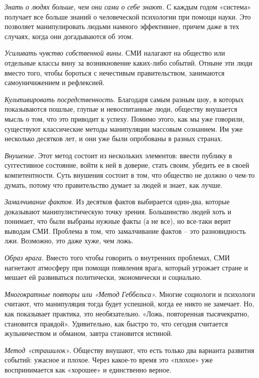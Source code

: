\textit{Знать о людях больше, чем они сами о себе знают.} С каждым годом «система» получает все больше знаний о человеческой психологии при помощи науки. Это позволяет манипулировать людьми намного эффективнее, причем даже в тех случаях, когда они догадываются об этом.

\textit{Усиливать чувство собственной вины.} СМИ налагают на общество или отдельные классы вину за возникновение каких-либо событий. Отныне эти люди вместо того, чтобы бороться с нечестивым правительством, занимаются самоуничижением и рефлексией.

\textit{Культивировать посредственность.} Благодаря самым разным шоу, в которых показываются пошлые, глупые и невоспитанные люди, обществу внушается мысль о том, что это приводит к успеху. Помимо этого, как мы уже говорили, существуют классические методы манипуляции массовым сознанием. Им уже несколько десятков лет, и они уже были опробованы в разных странах.

\textit{Внушение.} Этот метод состоит из нескольких элементов: ввести публику в суггестивное состояние, войти к ней в доверие, стать своим, убедить ее в своей компетентности. Суть внушения состоит в том, что общество не должно о чем-то думать, потому что правительство думает за людей и знает, как лучше.

\textit{Замалчивание фактов.} Из десятков фактов выбирается один-два, которые доказывают манипулистическую точку зрения. Большинство людей хоть и понимает, что были выбраны нужные факты (а не все), но все-таки верит выводам СМИ. Проблема в том, что замалчивание фактов – это разновидность лжи. Возможно, это даже хуже, чем ложь.

\textit{Образ врага.} Вместо того чтобы говорить о внутренних проблемах, СМИ нагнетают атмосферу при помощи появления врага, который угрожает стране и мешает ей развиваться политически, экономически и социально.

\textit{Многократные повторы или «Метод Геббельса».} Многие социологи и психологи считают, что манипуляция тогда будет успешной, когда ее никто не замечает. Но, как показывает практика, это необязательно. «Ложь, повторенная тысячекратно, становится правдой». Удивительно, как быстро то, что сегодня считается жульничеством и обманом, завтра становится истиной.

\textit{Метод «страшилок».} Обществу внушают, что есть только два варианта развития событий: ужасное и плохое. Через какое-то время это «плохое» уже воспринимается как «хорошее» и единственно верное.


